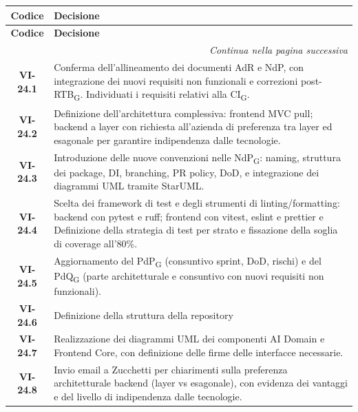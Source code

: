 \renewcommand{\arraystretch}{1.3}
\vspace{-0.3cm}
\noindent
\begin{longtable}{c p{12cm}}
	\toprule
	\textbf{Codice} & \textbf{Decisione} \\
	\midrule
	\endfirsthead

	\toprule
	\textbf{Codice} & \textbf{Decisione} \\
	\midrule
	\endhead

	\midrule
	\multicolumn{2}{r}{\textit{Continua nella pagina successiva}} \\
	\midrule
	\endfoot

	\bottomrule
	\endlastfoot

	\textbf{VI-24.1} & {Conferma dell’allineamento dei documenti AdR e NdP, con integrazione dei nuovi requisiti non funzionali e correzioni post-RTB\textsubscript{G}. Individuati i requisiti relativi alla CI\textsubscript{G}.} \\
    \textbf{VI-24.2} & {Definizione dell’architettura complessiva: frontend MVC pull; backend a layer con richiesta all’azienda di preferenza tra layer ed esagonale per garantire indipendenza dalle tecnologie.} \\
    \textbf{VI-24.3} & {Introduzione delle nuove convenzioni nelle NdP\textsubscript{G}: naming, struttura dei package, DI, branching, PR policy, DoD, e integrazione dei diagrammi UML tramite StarUML.} \\
    \textbf{VI-24.4} & {Scelta dei framework di test e degli strumenti di linting/formatting: backend con pytest e ruff; frontend con vitest, eslint e prettier e Definizione della strategia di test per strato e fissazione della soglia di coverage all’80\%.} \\
    \textbf{VI-24.5} & {Aggiornamento del PdP\textsubscript{G} (consuntivo sprint, DoD, rischi) e del PdQ\textsubscript{G} (parte architetturale e consuntivo con nuovi requisiti non funzionali).} \\
    \textbf{VI-24.6} & {Definizione della struttura della repository} \\
    \textbf{VI-24.7} & {Realizzazione dei diagrammi UML dei componenti AI Domain e Frontend Core, con definizione delle firme delle interfacce necessarie.} \\
    \textbf{VI-24.8} & {Invio email a Zucchetti per chiarimenti sulla preferenza architetturale backend (layer vs esagonale), con evidenza dei vantaggi e del livello di indipendenza dalle tecnologie.} \\

\end{longtable}

